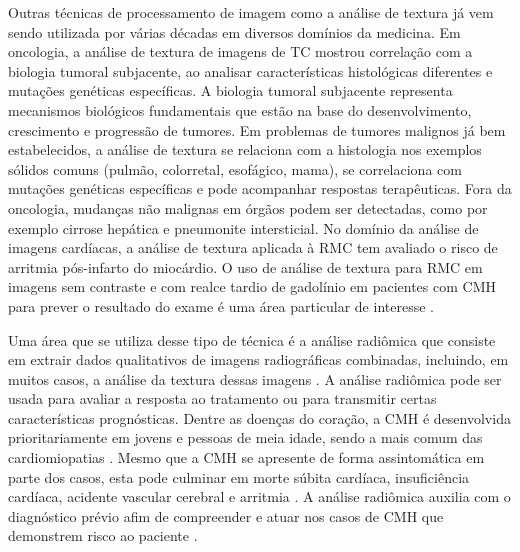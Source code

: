 Outras técnicas de processamento de imagem como a análise de textura já vem sendo utilizada por várias décadas em diversos domínios da medicina. Em oncologia, a análise de textura de imagens de \gls{TC} mostrou correlação com a biologia tumoral subjacente, ao analisar características histológicas diferentes e mutações genéticas específicas. A biologia tumoral subjacente representa mecanismos biológicos fundamentais que estão na base do desenvolvimento, crescimento e progressão de tumores. Em problemas de tumores malignos já bem estabelecidos, a análise de textura se relaciona com a histologia nos exemplos sólidos comuns (pulmão, colorretal, esofágico, mama), se correlaciona com mutações genéticas específicas e pode acompanhar respostas terapêuticas. Fora da oncologia, mudanças não malignas em órgãos podem ser detectadas, como por exemplo cirrose hepática e pneumonite intersticial. No domínio da análise de imagens cardíacas, a análise de textura aplicada à \gls{RMC} tem avaliado o risco de arritmia pós-infarto do miocárdio. O uso de análise de textura para \gls{RMC} em imagens sem contraste e com realce tardio de gadolínio em pacientes com \gls{CMH} para prever o resultado do exame é uma área particular de interesse \cite{schofieldTextureAnalysisCardiovascular2019a}.


Uma área que se utiliza desse tipo de técnica é a análise radiômica que consiste em extrair dados qualitativos de imagens radiográficas combinadas, incluindo, em muitos casos, a análise da textura dessas imagens \cite{lambinRadiomicsExtractingMore2012}. A análise radiômica pode ser usada para avaliar a resposta ao tratamento ou para transmitir certas características prognósticas. Dentre as doenças do coração, a \gls{CMH} é desenvolvida prioritariamente em jovens e pessoas de meia idade, sendo a mais comum das cardiomiopatias . Mesmo que a \gls{CMH} se apresente de forma assintomática em parte dos casos, esta pode culminar em morte súbita cardíaca, insuficiência cardíaca, acidente vascular cerebral e arritmia . A análise radiômica auxilia com o diagnóstico prévio afim de compreender e atuar nos casos de \gls{CMH} que demonstrem risco ao paciente \cite{kwonComparisonMortalityCause2022}.




